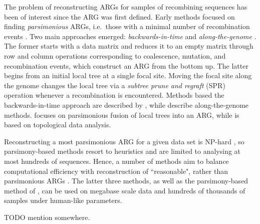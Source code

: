 \documentclass{article}
\begin{document}
The problem of reconstructing ARGs for samples of recombining sequences has
been of interest since the ARG was first defined. Early methods focused on
finding \emph{parsimonious} ARGs, i.e.\ those with a minimal number of
recombination events \citep{hein1990reconstructing}. Two main approaches
emerged: \emph{backwards-in-time} \citep{lyngso2005minimum} and
\emph{along-the-genome} \citep{song2003parsimonious, song2005constructing}. The
former starts with a data matrix and reduces it to an empty matrix through row
and column operations corresponding to coalescence, mutation, and recombination
events, which construct an ARG from the bottom up. The latter begins from an
initial local tree at a single focal site. Moving the focal site along the
genome changes the local tree via a \emph{subtree prune and regraft} (SPR)
operation whenever a recombination is encountered. Methods based the
backwards-in-time approach are described by \citet{song2005efficient,
wu2008association, thao2019hybrid, ignatieva2021kwarg}, while
\citet{hein1993heuristic, wu2011new, mirzaei2017rent} describe along-the-genome
methods. \citet{rasmussen2022espalier} focuses on parsimonious fusion of local
trees into an ARG, while \citet{camara2016inference} is based on topological
data analysis.

Reconstructing a most parsimonious ARG for a given data set is NP-hard
\citep{wang2001perfect}, so parsimony-based methods resort to heuristics and
are limited to analysing at most hundreds of sequences. Hence, a number of
methods aim to balance computational efficiency with reconstruction of
``reasonable", rather than parsimonious ARGs \citep{minichiello2006mapping,
parida2008estimating, kelleher2019inferring,  speidel2019method,
zhang2021biobank}. The latter three methods, as well as the parsimony-based
method of \citet{rasmussen2022espalier}, can be used on megabase scale data and
hundreds of thousands of samples under human-like parameters.

TODO mention \citep{schaefer2021ancestral} somewhere.

\end{document}
